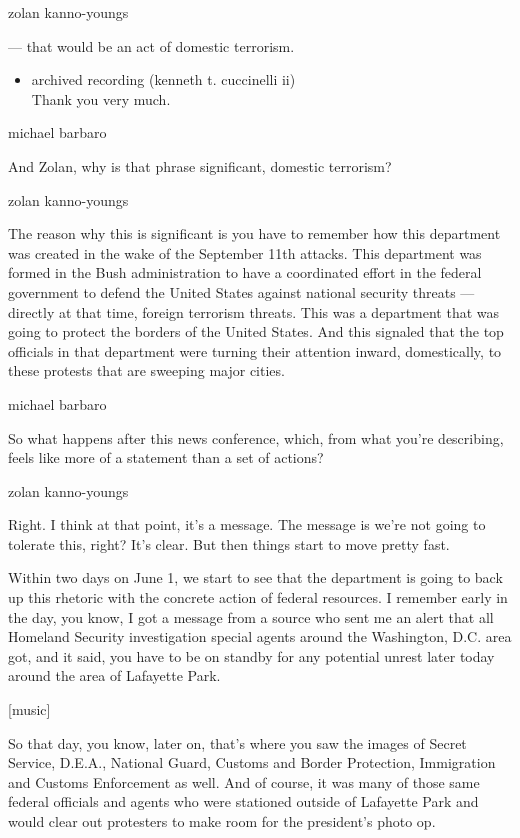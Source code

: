 zolan kanno-youngs

--- that would be an act of domestic terrorism.

\begin{itemize}
\tightlist
\item
  archived recording (kenneth t. cuccinelli ii)\\
  Thank you very much.
\end{itemize}

michael barbaro

And Zolan, why is that phrase significant, domestic terrorism?

zolan kanno-youngs

The reason why this is significant is you have to remember how this
department was created in the wake of the September 11th attacks. This
department was formed in the Bush administration to have a coordinated
effort in the federal government to defend the United States against
national security threats --- directly at that time, foreign terrorism
threats. This was a department that was going to protect the borders of
the United States. And this signaled that the top officials in that
department were turning their attention inward, domestically, to these
protests that are sweeping major cities.

michael barbaro

So what happens after this news conference, which, from what you're
describing, feels like more of a statement than a set of actions?

zolan kanno-youngs

Right. I think at that point, it's a message. The message is we're not
going to tolerate this, right? It's clear. But then things start to move
pretty fast.

Within two days on June 1, we start to see that the department is going
to back up this rhetoric with the concrete action of federal resources.
I remember early in the day, you know, I got a message from a source who
sent me an alert that all Homeland Security investigation special agents
around the Washington, D.C. area got, and it said, you have to be on
standby for any potential unrest later today around the area of
Lafayette Park.

{[}music{]}

So that day, you know, later on, that's where you saw the images of
Secret Service, D.E.A., National Guard, Customs and Border Protection,
Immigration and Customs Enforcement as well. And of course, it was many
of those same federal officials and agents who were stationed outside of
Lafayette Park and would clear out protesters to make room for the
president's photo op.

